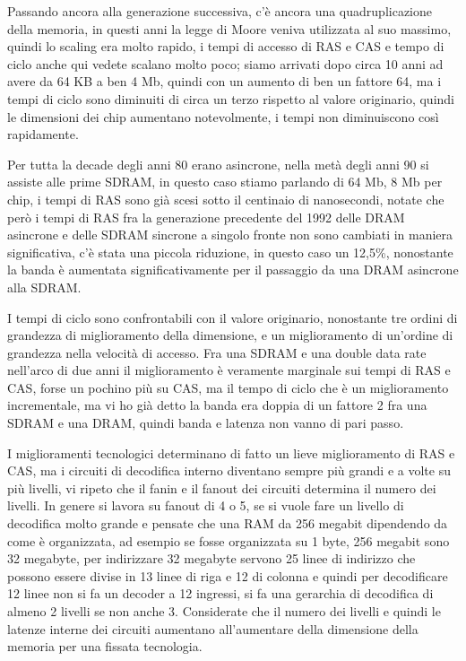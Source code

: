 Passando ancora alla generazione successiva, c'è ancora una quadruplicazione della memoria, in questi anni la legge di Moore veniva utilizzata al suo massimo, quindi lo scaling era molto rapido, i tempi di accesso di RAS e CAS e tempo di ciclo anche qui vedete scalano molto poco; siamo arrivati dopo circa 10 anni ad avere da 64 KB a ben 4 Mb, quindi con un aumento di ben un fattore 64, ma i tempi di ciclo sono diminuiti di circa un terzo rispetto al valore originario, quindi le dimensioni dei chip aumentano notevolmente, i tempi non diminuiscono così rapidamente.

Per tutta la decade degli anni 80 erano asincrone, nella metà degli anni 90 si assiste alle prime SDRAM, in questo caso stiamo parlando di 64 Mb, 8 Mb per chip, i tempi di RAS sono già scesi sotto il centinaio di nanosecondi, notate che però i tempi di RAS fra la generazione precedente del 1992 delle DRAM asincrone e delle SDRAM sincrone a singolo fronte non sono cambiati in maniera significativa, c'è stata una piccola riduzione, in questo caso un 12,5\%, nonostante la banda è aumentata significativamente per il passaggio da una DRAM asincrone alla SDRAM.

I tempi di ciclo sono confrontabili con il valore originario, nonostante tre ordini di grandezza di miglioramento della dimensione, e un miglioramento di un'ordine di grandezza nella velocità di accesso.
Fra una SDRAM e una double data rate nell'arco di due anni il miglioramento è veramente marginale sui tempi di RAS e CAS, forse un pochino più su CAS, ma il tempo di ciclo che è un miglioramento incrementale, ma vi ho già detto la banda era doppia di un fattore 2 fra una SDRAM e una DRAM, quindi banda e latenza non vanno di pari passo.

I miglioramenti tecnologici determinano di fatto un lieve miglioramento di RAS e CAS, ma i circuiti di decodifica interno diventano sempre più grandi e a volte su più livelli, vi ripeto che il fanin e il fanout dei circuiti determina il numero dei livelli. In genere si lavora su fanout di 4 o 5, se si vuole fare un livello di decodifica molto grande e pensate che una RAM da 256 megabit dipendendo da come è organizzata, ad esempio se fosse organizzata su 1 byte, 256 megabit sono 32 megabyte, per indirizzare 32 megabyte servono 25 linee di indirizzo che possono essere divise in 13 linee di riga e 12 di colonna e quindi per decodificare 12 linee non si fa un decoder a 12 ingressi, si fa una gerarchia di decodifica di almeno 2 livelli se non anche 3. Considerate che il numero dei livelli e quindi le latenze interne dei circuiti aumentano all'aumentare della dimensione della memoria per una fissata tecnologia.

